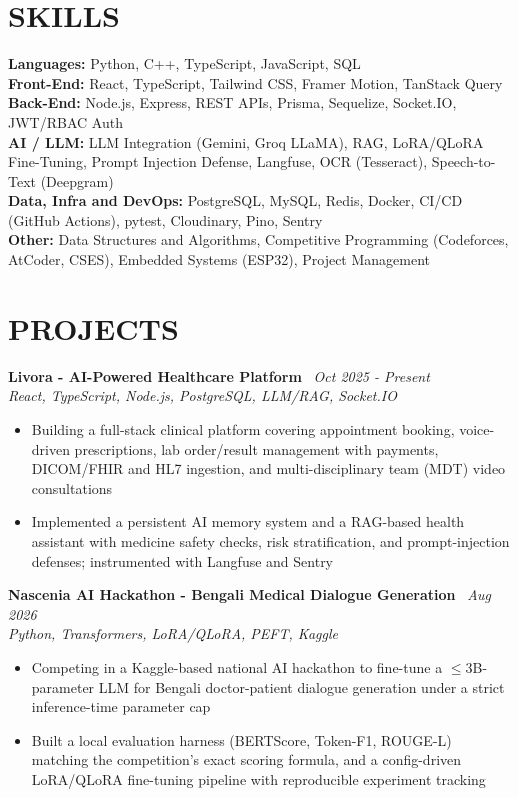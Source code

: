 \documentclass[10.5pt,a4paper]{article}
\newenvironment{tightitemize}{
  \begin{itemize}[leftmargin=15pt, itemsep=1pt, parsep=0pt, topsep=2pt]
}{
  \end{itemize}
}
\newcommand{\entrysimple}[2]{%
  \textbf{#1} \textbar\ \textit{#2}\\[1pt]
}
\begin{document}
\section*{SKILLS}
\textbf{Languages:} Python, C++, TypeScript, JavaScript, SQL\\[2pt]
\textbf{Front-End:} React, TypeScript, Tailwind CSS, Framer Motion, TanStack Query\\[2pt]
\textbf{Back-End:} Node.js, Express, REST APIs, Prisma, Sequelize, Socket.IO, JWT/RBAC Auth\\[2pt]
\textbf{AI / LLM:} LLM Integration (Gemini, Groq LLaMA), RAG, LoRA/QLoRA Fine-Tuning, Prompt Injection Defense, Langfuse, OCR (Tesseract), Speech-to-Text (Deepgram)\\[2pt]
\textbf{Data, Infra and DevOps:} PostgreSQL, MySQL, Redis, Docker, CI/CD (GitHub Actions), pytest, Cloudinary, Pino, Sentry\\[2pt]
\textbf{Other:} Data Structures and Algorithms, Competitive Programming (Codeforces, AtCoder, CSES), Embedded Systems (ESP32), Project Management

\section*{PROJECTS}

\entrysimple{Livora - AI-Powered Healthcare Platform}{Oct 2025 - Present}
\textit{React, TypeScript, Node.js, PostgreSQL, LLM/RAG, Socket.IO}
\begin{tightitemize}
  \item Building a full-stack clinical platform covering appointment booking, voice-driven prescriptions, lab order/result management with payments, DICOM/FHIR and HL7 ingestion, and multi-disciplinary team (MDT) video consultations
  \item Implemented a persistent AI memory system and a RAG-based health assistant with medicine safety checks, risk stratification, and prompt-injection defenses; instrumented with Langfuse and Sentry
\end{tightitemize}

\entrysimple{Nascenia AI Hackathon - Bengali Medical Dialogue Generation}{Aug 2026}
\textit{Python, Transformers, LoRA/QLoRA, PEFT, Kaggle}
\begin{tightitemize}
  \item Competing in a Kaggle-based national AI hackathon to fine-tune a $\leq$3B-parameter LLM for Bengali doctor-patient dialogue generation under a strict inference-time parameter cap
  \item Built a local evaluation harness (BERTScore, Token-F1, ROUGE-L) matching the competition's exact scoring formula, and a config-driven LoRA/QLoRA fine-tuning pipeline with reproducible experiment tracking
\end{tightitemize}
\end{document}
